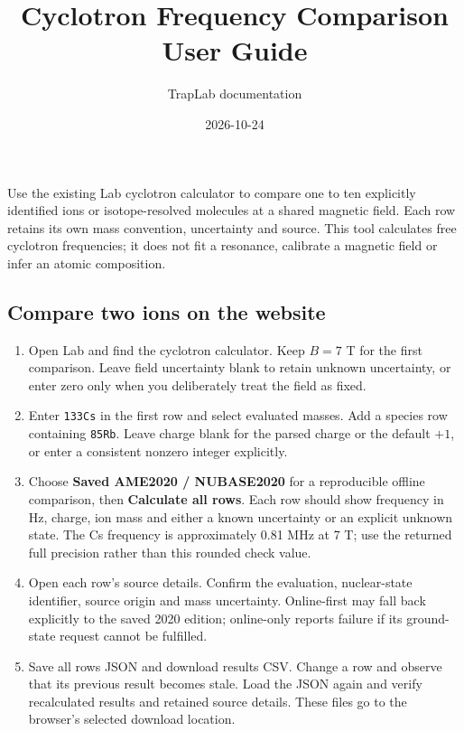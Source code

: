 \documentclass[
  aps,
  onecolumn,
  11pt]{revtex4-2}
\title{Cyclotron Frequency Comparison User Guide}
\author{TrapLab documentation}
\date{2026-10-24}
\providecommand{\tightlist}{%
  \setlength{\itemsep}{0pt}\setlength{\parskip}{0pt}}
\begin{document}
\maketitle

Use the existing Lab cyclotron calculator to compare one to ten
explicitly identified ions or isotope-resolved molecules at a shared
magnetic field. Each row retains its own mass convention, uncertainty
and source. This tool calculates free cyclotron frequencies; it does not
fit a resonance, calibrate a magnetic field or infer an atomic
composition.

\subsection{Compare two ions on the
website}\label{compare-two-ions-on-the-website}

\begin{enumerate}
\def\labelenumi{\arabic{enumi}.}
\tightlist
\item
  Open Lab and find the cyclotron calculator. Keep \(B=7\) T for the
  first comparison. Leave field uncertainty blank to retain unknown
  uncertainty, or enter zero only when you deliberately treat the field
  as fixed.
\item
  Enter \texttt{133Cs} in the first row and select evaluated masses. Add
  a species row containing \texttt{85Rb}. Leave charge blank for the
  parsed charge or the default \(+1\), or enter a consistent nonzero
  integer explicitly.
\item
  Choose \textbf{Saved AME2020 / NUBASE2020} for a reproducible offline
  comparison, then \textbf{Calculate all rows}. Each row should show
  frequency in Hz, charge, ion mass and either a known uncertainty or an
  explicit unknown state. The Cs frequency is approximately 0.81 MHz at
  7 T; use the returned full precision rather than this rounded check
  value.
\item
  Open each row's source details. Confirm the evaluation, nuclear-state
  identifier, source origin and mass uncertainty. Online-first may fall
  back explicitly to the saved 2020 edition; online-only reports failure
  if its ground-state request cannot be fulfilled.
\item
  Save all rows JSON and download results CSV. Change a row and observe
  that its previous result becomes stale. Load the JSON again and verify
  recalculated results and retained source details. These files go to
  the browser's selected download location.
\end{enumerate}
\end{document}
